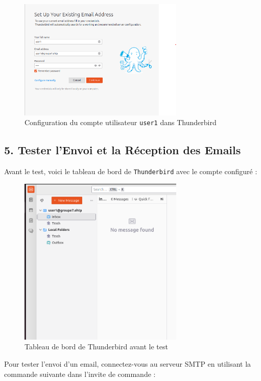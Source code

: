 \begin{figure}[h]
	\centering
	\includegraphics[width=0.7\textwidth]{SMTP/user1_email.png}
	\caption{Configuration du compte utilisateur \texttt{user1} dans Thunderbird}
	\label{fig:cmd}
\end{figure}

\subsection*{5. Tester l'Envoi et la Réception des Emails}
Avant le test, voici le tableau de bord de \texttt{Thunderbird} avec le compte configuré :
\newpage
\begin{figure}[h]
	\centering
	\includegraphics[width=0.7\textwidth]{SMTP/da.png}
	\caption{Tableau de bord de Thunderbird avant le test}
	\label{fig:cmd}
\end{figure}

Pour tester l'envoi d'un email, connectez-vous au serveur SMTP en utilisant la commande suivante dans l'invite de commande :

